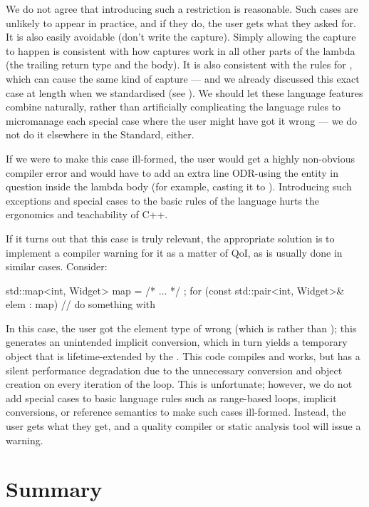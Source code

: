 We do not agree that introducing such a restriction is reasonable. Such cases are unlikely to appear in practice, and if they do, the user gets what they asked for. It is also easily avoidable (don't write the capture). Simply allowing the capture to happen is consistent with how captures work in all other parts of the lambda (the trailing return type and the body). It is also consistent with the rules for , which can cause the same kind of capture --- and we already discussed this exact case at length when we standardised  (see \cite{P1774R8}). We should let these language features combine naturally, rather than artificially complicating the language rules to micromanage each special case where the user might have got it wrong --- we do not do it elsewhere in the Standard, either.

If we were to make this case ill-formed, the user would get a highly non-obvious compiler error and would have to add an extra line ODR-using the entity in question inside the lambda body (for example, casting it to ). Introducing such exceptions and special cases to the basic rules of the language  hurts the ergonomics and teachability of C++.

If it turns out that this case is truly relevant, the appropriate solution is to implement a compiler warning for it as a matter of QoI, as is usually done in similar cases. Consider:

\begin{codeblock}
std::map<int, Widget> map = { /* ... */ };
for (const std::pair<int, Widget>& elem : map)
  // do something with 
\end{codeblock}

In this case, the user got the element type of  wrong (which is  rather than ); this generates an unintended implicit conversion, which in turn yields a temporary object that is lifetime-extended by the . This code compiles and works, but has a silent performance degradation due to the unnecessary conversion and object creation on every iteration of the loop. This is unfortunate; however, we do not add special cases to basic language rules such as range-based  loops, implicit conversions, or reference semantics to make such cases ill-formed. Instead, the user gets what they get, and a quality compiler or static analysis tool will issue a warning.

\section{Summary}

